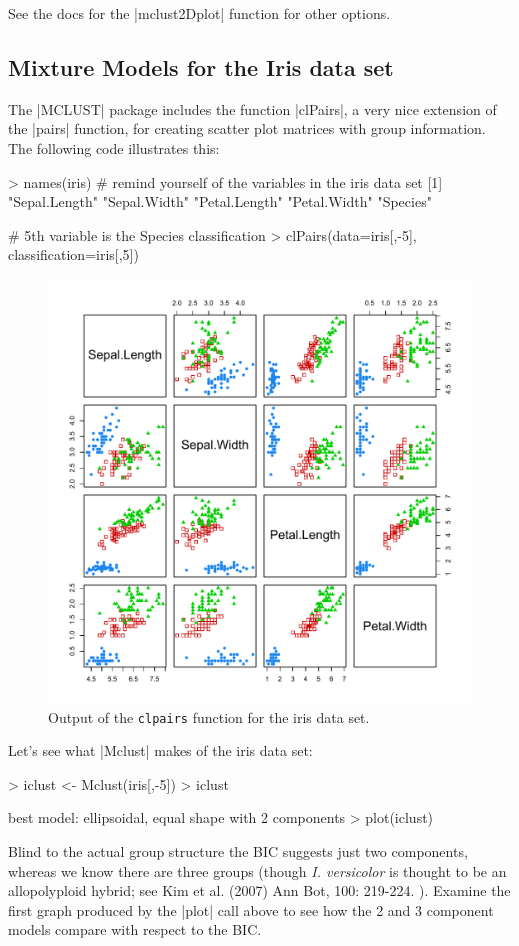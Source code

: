 See the docs for the |mclust2Dplot| function for other options.

\subsection{Mixture Models for the Iris data set}

The |MCLUST| package includes the function |clPairs|, a very nice extension of the |pairs| function, for creating scatter plot matrices with group information. The following code illustrates this:

\begin{R}
> names(iris) # remind yourself of the variables in the iris data set
[1] "Sepal.Length" "Sepal.Width"  "Petal.Length" "Petal.Width"  "Species"

# 5th variable is the Species classification
> clPairs(data=iris[,-5], classification=iris[,5])
\end{R}

\begin{figure}[!ht]
    \centering
    \includegraphics[width=0.5\columnwidth]{./figures/hands-on10/iris-clpairs.pdf}
    \caption{Output of the \texttt{clpairs} function for the iris data set.}\label{fig:clpairs}
\end{figure}

Let's see what |Mclust| makes of the iris data set:
%
\begin{R}
> iclust <- Mclust(iris[,-5])
> iclust

 best model: ellipsoidal, equal shape with 2 components
> plot(iclust)
\end{R}
%
Blind to the actual group structure the BIC suggests just two components, whereas we know there are three groups (though \textit{I. versicolor} is thought to be an allopolyploid hybrid; see Kim et al. (2007) Ann Bot, 100: 219-224. ). Examine the first graph produced by the |plot| call above to see how the 2 and 3 component models compare with respect to the BIC.

